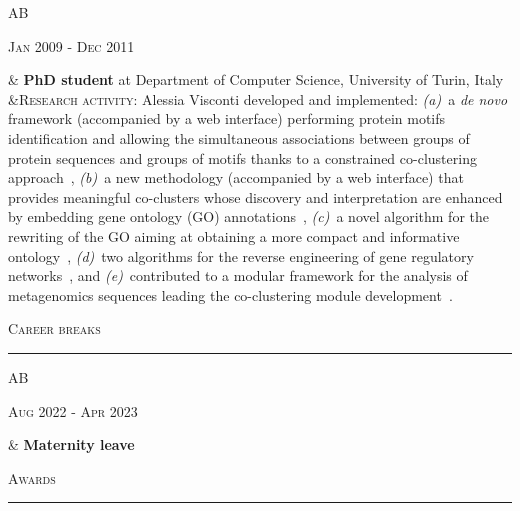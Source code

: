 \documentclass[a4paper,10pt]{article}
\newcommand{\mediumtitle}[1]{
	\vspace{0.2cm}
	{\noindent
	\Large \textsc{#1}\\[-2ex]
	\hrule
	\vspace{0.2cm}}
}
\newenvironment{doubletablelist}
{
	\vspace{-0.2cm}
	\begin{longtable}[!h]{AB}}{\end{longtable}
}
\newcommand{\dtlist}[2]{
\hspace{-3cm}
\noindent
	\begin{minipage}{0.22\textwidth}
	\begin{flushright}
	\textsc{#1}
	\end{flushright}
	\end{minipage}
	& #2\\[0.2cm]
}
\begin{document}
\begin{doubletablelist}
	\dtlist{Jan 2009 - Dec 2011}{\textbf{PhD student} at Department of Computer Science, University of Turin, Italy \\
	  &\textsc{Research activity}: Alessia Visconti developed and implemented: \emph{(a)}~a \emph{de novo} framework (accompanied by a web interface) performing protein motifs identification and allowing the simultaneous associations between groups of protein sequences and groups of motifs thanks to a constrained co-clustering approach~\cite{Cor09a}, \emph{(b)}~a new methodology (accompanied by a web interface) that provides meaningful co-clusters whose discovery and interpretation are enhanced by embedding gene ontology (GO) annotations~\cite{Vis11c,Cor09b}, \emph{(c)}~a novel algorithm for the rewriting of the GO aiming at obtaining a more compact and informative ontology~\cite{Vis11a,Vis10a}, \emph{(d)}~two algorithms for the reverse engineering of gene regulatory networks~\cite{Vis11b,Mar12,Vis12b}, and \emph{(e)}~contributed to a modular framework for the analysis of metagenomics sequences leading the co-clustering module development~\cite{Bon11}. %
	}
\end{doubletablelist}

\mediumtitle{Career breaks}
\begin{doubletablelist}
    \dtlist{Aug 2022 - Apr 2023}{\textbf{Maternity leave}
	}
\end{doubletablelist}

\mediumtitle{Awards}
\end{document}
